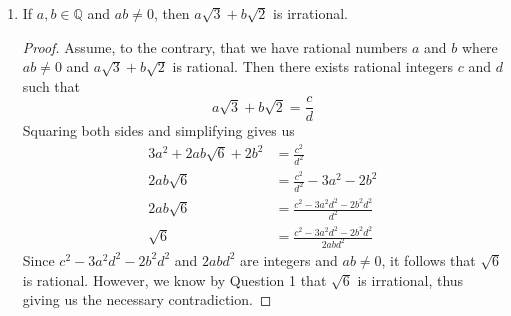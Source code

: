 \documentclass[11pt, oneside]{article}   	%
\begin{document}
\begin{enumerate}[ (a)]
	\item If $a,b \in \mathbb{Q}$ and $ab \neq 0$, then $a\sqrt{3} + b\sqrt{2}$ is irrational.
	\begin{proof}
		Assume, to the contrary, that we have rational numbers $a$ and $b$ where $ab \neq 0$ and $a\sqrt{3} + b\sqrt{2}$ is rational. Then there exists rational integers $c$ and $d$ such that
		$$a\sqrt{3} + b\sqrt{2} = \frac{c}{d}$$
		Squaring both sides and simplifying gives us
		\begin{align*}
			3a^2 + 2ab\sqrt{6} + 2b^2 & = \frac{c^2}{d^2} \\
			2ab\sqrt{6} & = \frac{c^2}{d^2} - 3a^2 -2b^2 \\
			2ab \sqrt{6} & = \frac{c^2-3a^2d^2-2b^2d^2}{d^2} \\
			\sqrt{6} & = \frac{c^2-3a^2d^2-2b^2d^2}{2abd^2}
		\end{align*}
		Since $c^2-3a^2d^2-2b^2d^2$ and $2abd^2$ are integers and $ab \neq 0$, it follows that $\sqrt{6}$ is rational. However, we know by Question 1 that $\sqrt{6}$ is irrational, thus giving us the necessary contradiction.
	\end{proof}
	
\end{enumerate}
\end{document}
